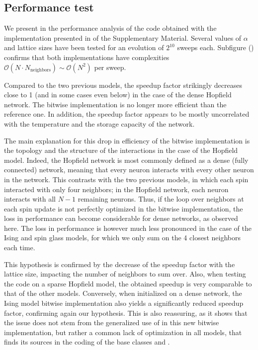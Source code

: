 \FloatBarrier
\subsection{Performance test}
We present in  the performance analysis of the code obtained with the implementation presented in  of the Supplementary Material. Several values of $\alpha$ and lattice sizes have been tested for an evolution of $2^{10}$ sweeps each.
Subfigure () confirms that both implementations have complexities $\mathcal{O}\left(N \cdot N_\text{neighbors}\right)\sim \mathcal{O}\left(N^2\right)$ per sweep.

Compared to the two previous models, the speedup factor strikingly decreases close to 1 (and in some cases even below) in the case of the dense Hopfield network. The bitwise implementation is no longer more efficient than the reference one. In addition, the speedup factor appears to be mostly uncorrelated with the temperature and the storage capacity of the network.

The main explanation for this drop in efficiency of the bitwise implementation is the topology and the structure of the interactions in the case of the Hopfield model. Indeed, the Hopfield network is most commonly defined as a dense (fully connected) network, meaning that every neuron interacts with every other neuron in the network. This contrasts with the two previous models, in which each spin interacted with only four neighbors; in the Hopfield network, each neuron interacts with all $N-1$ remaining neurons. Thus, if the loop over neighbors at each spin update is not perfectly optimized in the bitwise implementation, the loss in performance can become considerable for dense networks, as observed here. The loss in performance is however much less pronounced in the case of the Ising and spin glass models, for which we only sum on the 4 closest neighbors each time.

This hypothesis is confirmed by the decrease of the speedup factor with the lattice size, impacting the number of neighbors to sum over. Also, when testing the code on a sparse Hopfield model, the obtained speedup is very comparable to that of the other models. Conversely, when initialized on a dense network, the Ising model bitwise implementation also yields a significantly reduced speedup factor, confirming again our hypothesis. This is also reassuring, as it shows that the issue does not stem from the generalized use of \UnsignedInt in this new bitwise implementation, but rather a common lack of optimization in all models, that finds its sources in the coding of the base classes \Bits and \UnsignedInt.

